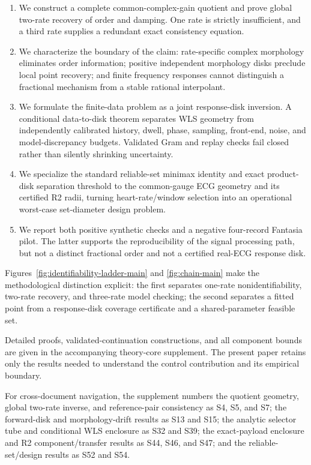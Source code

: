 \documentclass[11pt]{article}
\theoremstyle{definition}
\theoremstyle{remark}
\begin{document}
\begin{enumerate}[leftmargin=*,itemsep=2pt]
\item We construct a complete common-complex-gain quotient and prove global
      two-rate recovery of order and damping.  One rate is strictly
      insufficient, and a third rate supplies a redundant exact
      consistency equation.
\item We characterize the boundary of the claim: rate-specific complex
      morphology eliminates order information; positive independent
      morphology disks preclude local point recovery; and finite frequency
      responses cannot distinguish a fractional mechanism from a stable
      rational interpolant.
\item We formulate the finite-data problem as a joint response-disk inversion.
      A conditional data-to-disk theorem separates WLS geometry from
      independently calibrated history, dwell, phase, sampling, front-end,
      noise, and model-discrepancy budgets.  Validated Gram and replay checks
      fail closed rather than silently shrinking uncertainty.
\item We specialize the standard reliable-set minimax identity and exact
      product-disk separation threshold to the common-gauge ECG geometry and
      its certified R2 radii, turning heart-rate/window selection into an
      operational worst-case set-diameter design problem.
\item We report both positive synthetic checks and a negative four-record
      Fantasia pilot.  The latter supports the reproducibility of the signal
      processing path, but not a distinct fractional order and not a certified
      real-ECG response disk.
\end{enumerate}

Figures~\ref{fig:identifiability-ladder-main} and
\ref{fig:chain-main} make the methodological distinction explicit: the first
separates one-rate nonidentifiability, two-rate recovery, and three-rate model
checking; the second separates a fitted point from a response-disk coverage
certificate and a shared-parameter feasible set.

Detailed proofs, validated-continuation constructions, and all component
bounds are given in the accompanying theory-core supplement.  The present
paper retains only the results needed to understand the control contribution
and its empirical boundary.

For cross-document navigation, the supplement numbers the quotient geometry,
global two-rate inverse, and reference-pair consistency as S4, S5, and S7;
the forward-disk and morphology-drift results as S13 and S15; the analytic
selector tube and conditional WLS enclosure as S32 and S39; the exact-payload
enclosure and R2 component/transfer results as S44, S46, and S47; and the
reliable-set/design results as S52 and S54.
\end{document}
